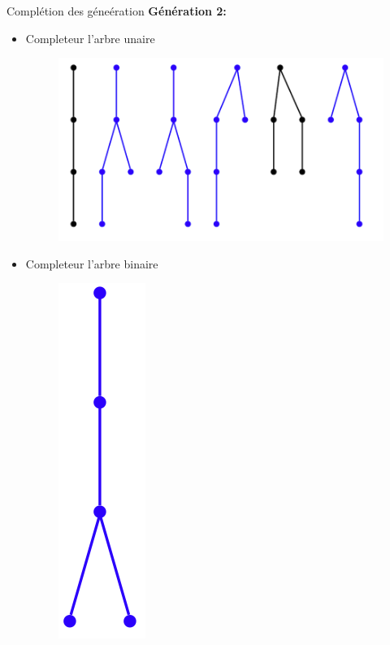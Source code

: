 \documentclass{beamer}
\begin{document}
\begin{frame}{Complétion des géneération}
\textbf{Génération 2:}\\
\begin{itemize}
\item  Completeur l'arbre unaire
\begin{figure}[h]
  \centering
  \includegraphics[scale=0.17]{gen2-1.png}
\end{figure}
\item Completeur l'arbre binaire
\begin{figure}[h]
  \centering
  \includegraphics[scale=0.17]{gen2-2.png}
\end{figure}
\end{itemize}
\end{frame}
\end{document}
